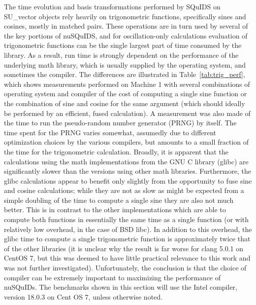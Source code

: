 \documentclass[3p,12pt]{elsarticle}
\begin{document}
The time evolution and basis transformations performed by SQuIDS on SU\_vector objects rely heavily on trigonometric functions, specifically sines and cosines, mostly in matched pairs. These operations are in turn used by several of the key portions of nuSQuIDS, and for oscillation-only calculations evaluation of trigonometric functions can be the single largest part of time consumed by the library. As a result, run time is strongly dependent on the performance of the underlying math library, which is usually supplied by the operating system, and sometimes the compiler. 
The differences are illustrated in Table~\ref{tab:trig_perf}, which shows measurements performed on Machine 1 with several combinations of operating system and compiler of the cost of computing a single sine function or the combination of sine and cosine for the same argument (which should ideally be performed by an efficient, fused calculation). A measurement was also made of the time to run the pseudo-random number generator (PRNG) by itself. The time spent for the PRNG varies somewhat, assumedly due to different optimization choices by the various compilers, but amounts to a small fraction of the time for the trigonometric calculation. Broadly, it is apparent that the calculations using the math implementations from the GNU C library (glibc) are significantly slower than the versions using other math libraries. Furthermore, the glibc calculations appear to benefit only slightly from the opportunity to fuse sine and cosine calculations; while they are not as slow as might be expected from a simple doubling of the time to compute a single sine they are also not much better. 
This is in contrast to the other implementations which are able to compute both functions in essentially the same time as a single function (or with relatively low overhead, in the case of BSD libc). In addition to this overhead, the glibc time to compute a single trigonometric function is approximately twice that of the other libraries (it is unclear why the result is far worse for clang 5.0.1 on CentOS 7, but this was deemed to have little practical relevance to this work and was not further investigated). Unfortunately, the conclusion is that the choice of compiler can be extremely important to maximizing the performance of nuSQuIDs. The benchmarks shown in this section will use the Intel compiler, version 18.0.3 on Cent OS 7, unless otherwise noted. 
\end{document}
